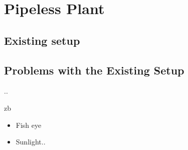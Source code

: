 \section{Pipeless Plant} %

\subsection{Existing setup}

\subsection{Problems with the Existing Setup}
..

zb
\begin{itemize}
\item Fish eye
\item Sunlight..
\end{itemize}